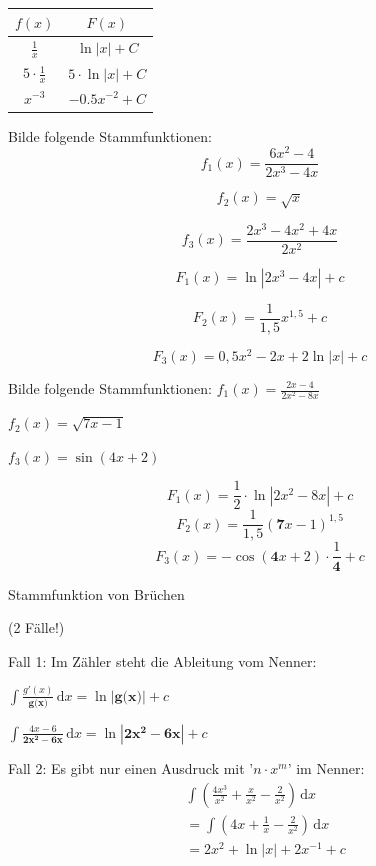 \documentclass[paper=a6,ngerman,twoside=true,fontsize=14pt, parskip = half]{scrartcl}
\begin{document}
\begin{antwort}
\begin{center}
	\renewcommand{\arraystretch}{1.6} %
	\begin{tabular}{c|c}
	$f(x)$ & $F(x)$ \\
	\hline
	$\frac{1}{x}$ & $\ln|x| + C$ \\[0.5em]
	$5 \cdot \frac{1}{x}$ & $5 \cdot \ln|x| + C$ \\[0.5em]
	$x^{-3}$ & $-0.5x^{-2} + C$ \\
	\end{tabular}
\end{center}
\end{antwort}
\begin{frage}
	Bilde folgende Stammfunktionen: 
	\[f_1(x)=\frac{6x^2-4}{2x^3-4x}\]
	
	\[f_2(x)=\sqrt{x}\]
	
	\[f_3(x)=\frac{2x^3-4x^2+4x}{2x^2}\]
\end{frage}
\begin{antwort}

\[
F_1(x) = \ln|2x^3-4x| + c
\]



\[
F_2(x) = \frac{1}{1,5}x^{1,5} + c
\]


\[
F_3(x) = 0,5x^2 - 2x + 2\ln|x| + c
\]
\end{antwort}
\begin{frage}
	Bilde folgende Stammfunktionen: 
	\flushleft 
	$f_1(x)=\frac{2x-4}{2x^2-8x}$
	
	\bigskip
	$f_2(x)=\sqrt{7x-1}$
	
	\bigskip
	$f_3(x)=\sin(4x+2)$	
\end{frage}
\begin{antwort}
\[F_1(x)=\frac{1}{2}\cdot \ln|2x^2-8x|+c\]
\[F_2(x)=\frac{1}{1,5}(\bm{7}x-1)^{1,5}\]
\[F_3(x)=-\cos(\bm{4}x+2)\cdot\frac{1}{\bm{4}}+c\]
\end{antwort}
\begin{frage}
	Stammfunktion von Brüchen
	
	(2 Fälle!)
\end{frage}
\begin{antwort}

 Fall 1: Im Zähler steht die Ableitung vom Nenner:
	
	$\displaystyle\int \! \frac{g'(x)}{\textbf{g(x)}} \, \mathrm{d}x=\ln|\textbf{g(x)}|+c$
	
	$\displaystyle\int \! \frac{4x-6}{\bm{2x^2-6x}} \, \mathrm{d}x=\ln|\bm{2x^2-6x}|+c$

	\bigskip
	Fall 2: Es gibt nur einen Ausdruck mit '$n \cdot x^m$' im Nenner:
	 \begin{align*}
	 &\displaystyle\int \! (\frac{4x^3}{{x^2}}+\frac{x}{{x^2}}-\frac{2}{{x^2}}) \, \mathrm{d}x \\
	 &=\displaystyle\int \! (4x+\frac{1}{{x}}-\frac{2}{{x^2}}) \, \mathrm{d}x \\
	 &=\displaystyle 2x^2+\ln|x|+2x^{-1}+c
	 \end{align*}
\end{antwort}
\end{document}
